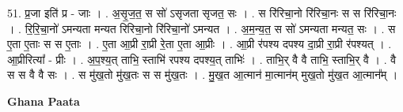 \documentclass[17pt]{extarticle}
\begin{document}
51. प्र॒जा इति॑ प्र - जाः । . अ॒सृ॒ज॒त॒ स सो॑ ऽसृजता सृजत॒ सः । . स रि॑रिचा॒नो रि॑रिचा॒नः स स रि॑रिचा॒नः । . रि॒रि॒चा॒नो॑ ऽमन्यता मन्यत रिरिचा॒नो रि॑रिचा॒नो॑ ऽमन्यत । . अ॒म॒न्य॒त॒ स सो॑ ऽमन्यता मन्यत॒ सः । . स ए॒ता ए॒ताः स स ए॒ताः । . ए॒ता आ॒प्री रा॒प्री रे॒ता ए॒ता आ॒प्रीः । . आ॒प्री र॑पश्य दपश्य दा॒प्री रा॒प्री र॑पश्यत् । . आ॒प्रीरित्या᳚ - प्रीः । . अ॒प॒श्य॒त् ताभि॒ स्ताभि॑ रपश्य दपश्य॒त् ताभिः॑ । . ताभि॒र् वै वै ताभि॒ स्ताभि॒र् वै । . वै स स वै वै सः । . स मु॑ख॒तो मु॑ख॒तः स स मु॑ख॒तः । . मु॒ख॒त आ॒त्मान॑ मा॒त्मान॑म् मुख॒तो मु॑ख॒त आ॒त्मान᳚म् । \newline

\textbf{Ghana Paata } \newline
\end{document}

